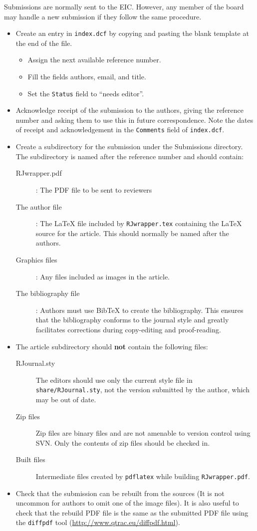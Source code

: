 \documentclass[11pt]{article}
\begin{document}
Submissions are normally sent to the EIC. However, any member of the
board may handle a new submission if they follow the same procedure.

\begin{itemize}
\item Create an entry in \texttt{index.dcf} by copying and pasting the
  blank template at the end of the file.
  \begin{itemize}
  \item Assign the next available reference number.
  \item Fill the  fields authors, email, and title.
  \item Set the \texttt{Status} field to ``needs editor''.
  \end{itemize}
\item Acknowledge receipt of the submission to the authors, giving the
  reference number and asking them to use this in future
  correspondence.  Note the dates of receipt and acknowledgement in
  the \texttt{Comments} field of \texttt{index.dcf}.
\item Create a subdirectory for the submission under the Submissions
  directory.  The subdirectory is named after the reference number and
  should contain:
  \begin{description}
  \item[RJwrapper.pdf]: The PDF file to be sent to reviewers
  \item[The author file]: The LaTeX file included by \texttt{RJwrapper.tex}
    containing the LaTeX source for the article. This should normally
    be named after the authors.
  \item[Graphics files]: Any files included as images in the article.
  \item[The bibliography file]: Authors must use BibTeX to create the
    bibliography. This ensures that the bibliography conforms to the 
    journal style and greatly facilitates corrections during copy-editing
    and proof-reading.
  \end{description}
\item The article subdirectory should {\bf not} contain the following files:
  \begin{description}
  \item[RJournal.sty] The editors should use only the current style
    file in \texttt{share/RJournal.sty}, not the version submitted by
    the author, which may be out of date.
  \item[Zip files] Zip files are binary files and are not amenable to
    version control using SVN. Only the contents of zip files should
    be checked in.
  \item[Built files] Intermediate files created by \texttt{pdflatex}
    while building \texttt{RJwrapper.pdf}.
  \end{description}
\item Check that the submission can be rebuilt from the sources (It is
  not uncommon for authors to omit one of the image files). It is also
  useful to check that the rebuild PDF file is the same as the
  submitted PDF file using the \texttt{diffpdf} tool
  (\url{http://www.qtrac.eu/diffpdf.html}).
\end{itemize}
\end{document}
